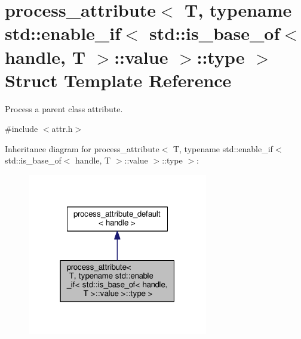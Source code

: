 \hypertarget{structprocess__attribute_3_01_t_00_01typename_01std_1_1enable__if_3_01std_1_1is__base__of_3_01hac52f26afeeb97d5e0622f449789fb756}{}\section{process\+\_\+attribute$<$ T, typename std\+:\+:enable\+\_\+if$<$ std\+:\+:is\+\_\+base\+\_\+of$<$ handle, T $>$\+:\+:value $>$\+:\+:type $>$ Struct Template Reference}
\label{structprocess__attribute_3_01_t_00_01typename_01std_1_1enable__if_3_01std_1_1is__base__of_3_01hac52f26afeeb97d5e0622f449789fb756}


Process a parent class attribute.  




{\ttfamily \#include $<$attr.\+h$>$}



Inheritance diagram for process\+\_\+attribute$<$ T, typename std\+:\+:enable\+\_\+if$<$ std\+:\+:is\+\_\+base\+\_\+of$<$ handle, T $>$\+:\+:value $>$\+:\+:type $>$\+:
\nopagebreak
\begin{figure}[H]
\begin{center}
\leavevmode
\includegraphics[width=223pt]{structprocess__attribute_3_01_t_00_01typename_01std_1_1enable__if_3_01std_1_1is__base__of_3_01ha19012cda51a44e2f6715a41f1471661c}
\end{center}
\end{figure}



